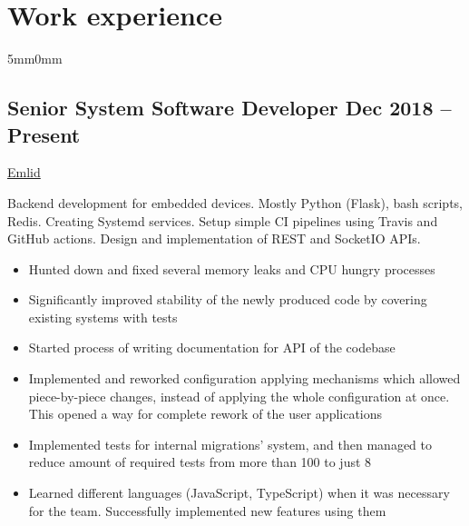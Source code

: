 \documentclass[10pt]{article}
\newcommand{\lmvalue}{5mm}
\newcommand{\rmvalue}{0mm}
\begin{document}
    \section*{Work experience}
    \begin{changemargin}{\lmvalue}{\rmvalue}
        \subsection*{Senior System Software Developer \hfill {\color{gray}Dec 2018 –
        Present}}
        \href{https://emlid.com}{Emlid}

        Backend development for embedded devices.
        Mostly Python (Flask), bash scripts, Redis.
        Creating Systemd services.
        Setup simple CI pipelines using Travis and GitHub actions.
        Design and implementation of REST and SocketIO APIs.
        \begin{itemize}
            \item Hunted down and fixed several memory leaks and CPU hungry
            processes
            \item Significantly improved stability of the newly produced
            code by covering existing systems with tests
            \item Started process of writing documentation for API of the
            codebase
            \item Implemented and reworked configuration applying
            mechanisms which allowed piece-by-piece changes, instead of applying the whole
            configuration at once.
            This opened a way for complete rework of the user applications
            \item Implemented tests for internal migrations' system, and
            then managed to reduce amount of required tests from more than 100 to just 8
            \item Learned different languages (JavaScript, TypeScript) when
            it was necessary for the team.
            Successfully implemented new features using them
        \end{itemize}


\end{changemargin}
\end{document}
